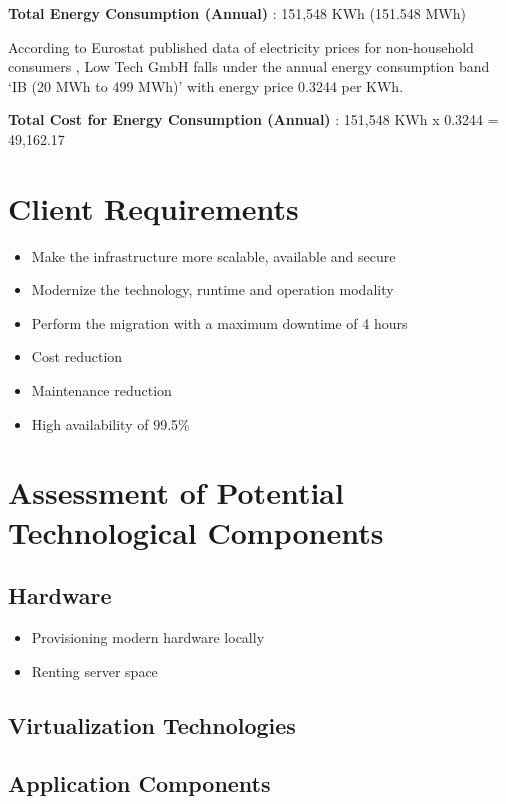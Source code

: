 \documentclass{llncs}
\begin{document}
\textbf{Total Energy Consumption (Annual)} : 151,548 KWh (151.548 MWh)

According to Eurostat published data of electricity prices for non-household consumers \cite{eurostat2023}, Low Tech GmbH falls under the annual energy consumption band 
`IB (20 MWh to 499 MWh)' with energy price 0.3244 \EUR{} per KWh.


\textbf{Total Cost for Energy Consumption (Annual)} : 151,548 KWh x 0.3244 \EUR{} = 49,162.17 \EUR{}

\section{Client Requirements}

\begin{itemize}
  \item Make the infrastructure more scalable, available and secure
  \item Modernize the technology, runtime and operation modality
  \item Perform the migration with a maximum downtime of 4 hours
  \item Cost reduction
  \item Maintenance reduction
  \item High availability of 99.5\%
\end{itemize}

\section{Assessment of Potential Technological Components}

\subsection{Hardware}

\begin{itemize}
  \item Provisioning modern hardware locally
  \item Renting server space
\end{itemize}

\subsection{Virtualization Technologies}


\subsection{Application Components}
\end{document}
